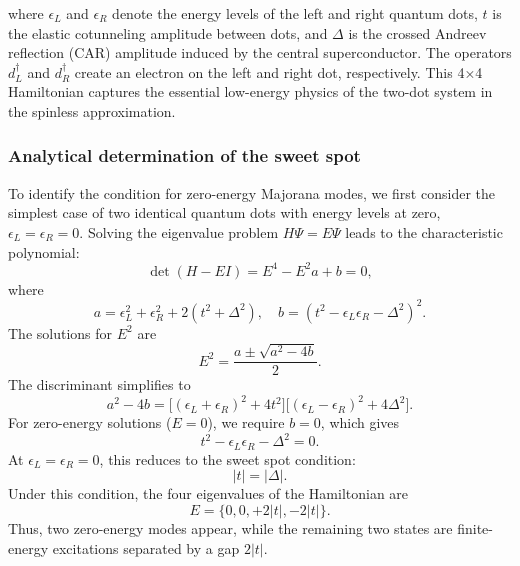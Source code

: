 \documentclass[11pt, letterpaper, titlepage]{article}
\begin{document}
where $\epsilon_L$ and $\epsilon_R$ denote the energy levels of the left and right quantum dots, $t$ is the elastic cotunneling amplitude between dots, and $\Delta$ is the crossed Andreev reflection (CAR) amplitude induced by the central superconductor. The operators $d_L^\dagger$ and $d_R^\dagger$ create an electron on the left and right dot, respectively. This 4×4 Hamiltonian captures the essential low-energy physics of the two-dot system in the spinless approximation.

\subsubsection{Analytical determination of the sweet spot}
To identify the condition for zero-energy Majorana modes, we first consider the simplest case of two identical quantum dots with energy levels at zero, \(\epsilon_L = \epsilon_R = 0\). Solving the eigenvalue problem \(H \Psi = E \Psi\) leads to the characteristic polynomial:
\[
\det(H - E I) = E^4 - E^2 a + b = 0,
\]
where
\[
a = \epsilon_L^2 + \epsilon_R^2 + 2(t^2 + \Delta^2), \quad
b = (t^2 - \epsilon_L \epsilon_R - \Delta^2)^2.
\]
The solutions for \(E^2\) are
\[
E^2 = \frac{a \pm \sqrt{a^2 - 4b}}{2}.
\]
The discriminant simplifies to 
\[
a^2 - 4b = \big[(\epsilon_L + \epsilon_R)^2 + 4t^2\big] \big[(\epsilon_L - \epsilon_R)^2 + 4\Delta^2\big].
\]
For zero-energy solutions (\(E = 0\)), we require \(b = 0\), which gives
\[
t^2 - \epsilon_L \epsilon_R - \Delta^2 = 0.
\]
At \(\epsilon_L = \epsilon_R = 0\), this reduces to the sweet spot condition:
\[
|t| = |\Delta|.
\]
Under this condition, the four eigenvalues of the Hamiltonian are
\[
E = \{0, 0, +2|t|, -2|t|\}.
\]
Thus, two zero-energy modes appear, while the remaining two states are finite-energy excitations separated by a gap \(2|t|\).
\end{document}
